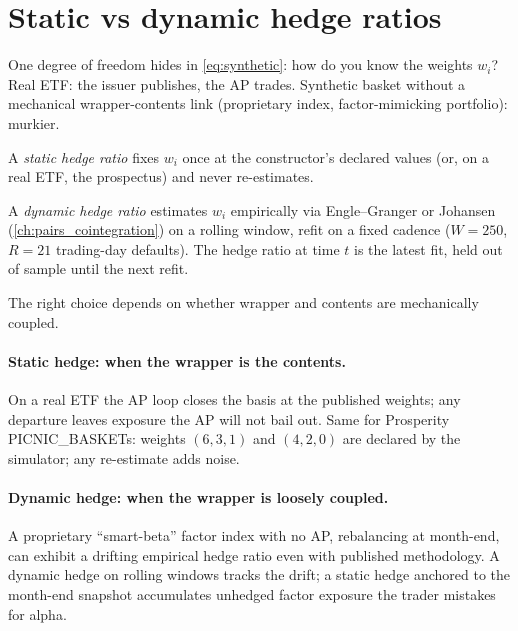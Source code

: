 \section{Static vs dynamic hedge ratios}
\label{sec:ch11_static_dynamic}

One degree of freedom hides in \eqref{eq:synthetic}: how do you
know the weights $w_i$? Real ETF: the issuer publishes, the AP
trades. Synthetic basket without a mechanical wrapper-contents
link (proprietary index, factor-mimicking portfolio): murkier.

\begin{definition}
\label{def:static_hedge}
A \emph{static hedge ratio} fixes $w_i$ once at the constructor's
declared values (or, on a real ETF, the prospectus) and never
re-estimates.
\end{definition}

\begin{definition}
\label{def:dynamic_hedge}
A \emph{dynamic hedge ratio} estimates $w_i$ empirically via
Engle--Granger or Johansen (\cref{ch:pairs_cointegration}) on a
rolling window, refit on a fixed cadence ($W = 250$, $R = 21$
trading-day defaults). The hedge ratio at time $t$ is the latest
fit, held out of sample until the next refit.
\end{definition}

The right choice depends on whether wrapper and contents are
mechanically coupled.

\paragraph{Static hedge: when the wrapper is the contents.} On a
real ETF the AP loop closes the basis at the published weights;
any departure leaves exposure the AP will not bail out. Same for
Prosperity PICNIC\_BASKETs: weights $(6, 3, 1)$ and $(4, 2, 0)$
are declared by the simulator; any re-estimate adds noise.

\paragraph{Dynamic hedge: when the wrapper is loosely coupled.} A
proprietary ``smart-beta'' factor index with no AP, rebalancing
at month-end, can exhibit a drifting empirical hedge ratio even
with published methodology. A dynamic hedge on rolling windows
tracks the drift; a static hedge anchored to the month-end
snapshot accumulates unhedged factor exposure the trader
mistakes for alpha.

